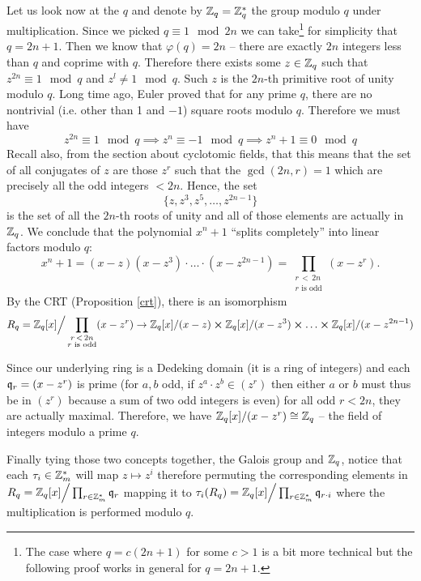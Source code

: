 Let us look now at the $q$ and denote by $\mathbb{Z}_q = \mathbb{Z}_q^*$ the group modulo $q$ under multiplication. Since we picked $q \equiv 1 \mod 2n$ we can take\footnote{The case where $q = c(2n+1)$ for some $c > 1$ is a bit more technical but the following proof works in general for $q = 2n+1$.} for simplicity that $q = 2n + 1$. Then we know that $\varphi(q) = 2n$ -- there are exactly $2n$ integers less than $q$ and coprime with $q$. Therefore there exists some $z \in \mathbb{Z}_q$ such that $z^{2n} \equiv 1 \mod q$ and $z^l \neq 1 \mod q$. Such $z$ is the $2n$-th primitive root of unity modulo $q$. Long time ago, Euler proved that for any prime $q$, there are no nontrivial (i.e. other than 1 and $-1$) square roots modulo $q$. Therefore we must have
\[ z^{2n} \equiv 1 \mod q \implies z^n \equiv -1 \mod q \implies z^n + 1 \equiv 0 \mod q\]
Recall also, from the section about cyclotomic fields, that this means that the set of all conjugates of $z$ are those $z^r$ such that the $\gcd(2n, r) = 1$ which are precisely all the odd integers $< 2n$. Hence, the set
\[ \{z, z^3, z^5, \ldots, z^{2n-1} \} \]
is the set of all the $2n$-th roots of unity and all of those elements are actually in $\mathbb{Z}_q$. We conclude that the polynomial $x^n +1$ ``splits completely'' into linear factors modulo $q$:
\[ x^n + 1 = (x-z)(x-z^3) \cdot \ldots \cdot (x-z^{2n-1}) = \prod_{\substack{r \, <\, 2n \\ r \text{ is odd}}} (x-z^r). \]
By the CRT (Proposition \ref{crt}), there is an isomorphism
\[ R_q = \mathbb{Z}_q[x] \Big/\prod_{\substack{r \, < \, 2n \\ r \text{ is odd}}}(x-z^r) \rightarrow  \mathbb{Z}_q[x]/(x-z) \cross  \mathbb{Z}_q[x]/(x-z^3) \cross \ldots \cross  \mathbb{Z}_q[x]/(x-z^{2n-1})\]

Since our underlying ring is a Dedeking domain (it is a ring of integers) and each $\mathfrak{q}_r = (x-z^r)$ is prime (for $a,b$ odd, if $z^a \cdot z^b \in (z^r)$ then either $a$ or $b$ must thus be in $(z^r)$ because a sum of two odd integers is even) for all odd $r < 2n$, they are actually maximal. Therefore, we have $\mathbb{Z}_q[x]/(x-z^r) \cong \mathbb{Z}_q$ -- the field of integers modulo a prime $q$. 

Finally tying those two concepts together, the Galois group and $\mathbb{Z}_q$, notice that each $\tau_i \in \mathbb{Z}_m^*$ will map $z \mapsto z^i$ therefore permuting the corresponding elements in $R_q = \mathbb{Z}_q[x] \Big/\prod_{r \in \mathbb{Z}_m^*}\mathfrak{q}_r$ mapping it to $\tau_i(R_q) = \mathbb{Z}_q[x] \Big/\prod_{r \in \mathbb{Z}_m^*}\mathfrak{q}_{r\cdot i}$ where the multiplication is performed modulo $q$.

